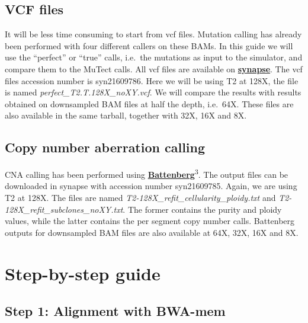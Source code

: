 \documentclass[]{article}
\begin{document}
\hypertarget{vcf-files}{%
\subsection{VCF files}\label{vcf-files}}

It will be less time consuming to start from vcf files. Mutation calling
has already been performed with four different callers on these BAMs. In
this guide we will use the ``perfect'' or ``true'' calls, i.e.~the
mutations as input to the simulator, and compare them to the MuTect
calls. All vcf files are available on
\href{https://www.synapse.org/\#!Synapse:syn2813581/wiki/303137}{\textbf{synapse}}.
The vcf files accession number is syn21609786. Here we will be using T2
at 128X, the file is named \emph{perfect\_T2.T.128X\_noXY.vcf}. We will
compare the results with results obtained on downsampled BAM files at
half the depth, i.e.~64X. These files are also available in the same
tarball, together with 32X, 16X and 8X.

\hypertarget{copy-number-aberration-calling}{%
\subsection{Copy number aberration
calling}\label{copy-number-aberration-calling}}

CNA calling has been performed using
\href{https://github.com/Wedge-Oxford/battenberg}{\textbf{Battenberg}}\textsuperscript{3}.
The output files can be downloaded in synapse with accession number
syn21609785. Again, we are using T2 at 128X. The files are named
\emph{T2-128X\_refit\_cellularity\_ploidy.txt} and
\emph{T2-128X\_refit\_subclones\_noXY.txt}. The former contains the
purity and ploidy values, while the latter contains the per segment copy
number calls. Battenberg outputs for downsampled BAM files are also
available at 64X, 32X, 16X and 8X.

\newpage

\hypertarget{step-by-step-guide}{%
\section{Step-by-step guide}\label{step-by-step-guide}}

\hypertarget{step-1-alignment-with-bwa-mem}{%
\subsection{Step 1: Alignment with
BWA-mem}\label{step-1-alignment-with-bwa-mem}}
\end{document}
